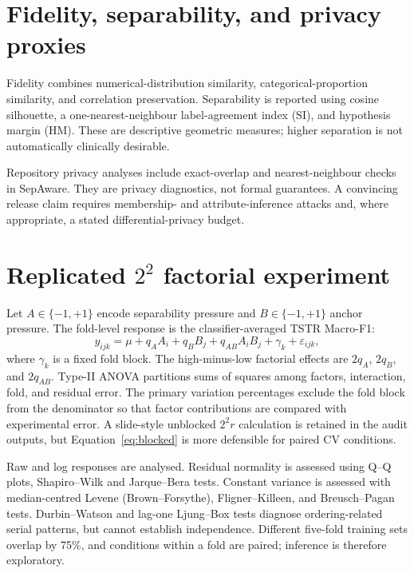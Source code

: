 \section{Fidelity, separability, and privacy proxies}

Fidelity combines numerical-distribution similarity, categorical-proportion similarity, and correlation preservation. Separability is reported using cosine silhouette, a one-nearest-neighbour label-agreement index (SI), and hypothesis margin (HM). These are descriptive geometric measures; higher separation is not automatically clinically desirable.

Repository privacy analyses include exact-overlap and nearest-neighbour checks in SepAware. They are privacy diagnostics, not formal guarantees. A convincing release claim requires membership- and attribute-inference attacks and, where appropriate, a stated differential-privacy budget.

\section{Replicated $2^2$ factorial experiment}

Let $A\in\{-1,+1\}$ encode separability pressure and $B\in\{-1,+1\}$ anchor pressure. The fold-level response is the classifier-averaged TSTR Macro-F1:
\begin{equation}
y_{ijk}=\mu+q_A A_i+q_B B_j+q_{AB}A_iB_j+\gamma_k+\varepsilon_{ijk},
\label{eq:blocked}
\end{equation}
where $\gamma_k$ is a fixed fold block. The high-minus-low factorial effects are $2q_A$, $2q_B$, and $2q_{AB}$. Type-II ANOVA partitions sums of squares among factors, interaction, fold, and residual error. The primary variation percentages exclude the fold block from the denominator so that factor contributions are compared with experimental error. A slide-style unblocked $2^2r$ calculation is retained in the audit outputs, but Equation~\ref{eq:blocked} is more defensible for paired CV conditions.

Raw and log responses are analysed. Residual normality is assessed using Q--Q plots, Shapiro--Wilk and Jarque--Bera tests. Constant variance is assessed with median-centred Levene (Brown--Forsythe), Fligner--Killeen, and Breusch--Pagan tests. Durbin--Watson and lag-one Ljung--Box tests diagnose ordering-related serial patterns, but cannot establish independence. Different five-fold training sets overlap by 75\%, and conditions within a fold are paired; inference is therefore exploratory.

